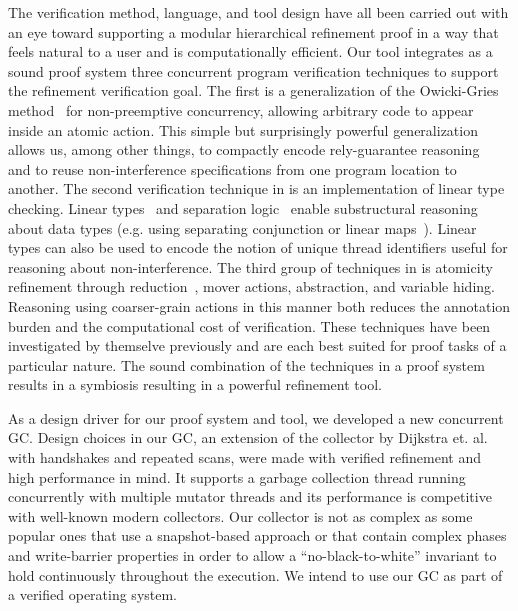 The verification method, language, and tool design have all been carried out with an eye toward supporting a modular hierarchical refinement proof in a way that feels natural to a user and is computationally efficient. 
Our tool integrates as a sound proof system three concurrent program verification techniques to support the refinement verification goal. 
The first \civl is a generalization of the Owicki-Gries method~\cite{OwickiG76} for non-preemptive concurrency, 
allowing arbitrary code to appear inside an atomic action. 
This simple but surprisingly powerful generalization allows us, among other things, to compactly encode rely-guarantee reasoning~\cite{Jones83}
and to reuse non-interference specifications from one program location to another.
The second verification technique in \civl is an implementation of linear type checking.
Linear types~\cite{Wadler90lineartypes} and separation logic~\cite{Reynolds02} enable substructural reasoning about data types
(e.g. using separating conjunction or linear maps~\cite{LahiriQW11}).
Linear types can also be used to encode the notion of unique thread identifiers useful for reasoning about non-interference. 
The third group of techniques in \civl is atomicity refinement through reduction~\cite{Lipton}, mover actions, abstraction, and variable hiding.
Reasoning using coarser-grain actions in this manner both reduces the annotation burden and the computational cost of verification. 
These techniques have been investigated by themselve previously and are each best suited for proof tasks of a particular nature. 
The sound combination of the techniques in a proof system results in a symbiosis resulting in a powerful refinement tool. 

As a design driver for our proof system and tool, we developed a new concurrent GC. 
Design choices in our GC, an extension of the collector by Dijkstra et. al. \cite{dijk78}  with handshakes \cite{doli93,doli94} and repeated scans, were made with verified refinement and high performance in mind. 
It supports a garbage collection thread running concurrently with multiple mutator threads and its performance is competitive with well-known modern collectors. 
Our collector is not as complex as some popular ones that use a snapshot-based approach \cite{doli93,doli94,doma00,azat03} or that contain complex phases and write-barrier properties \cite{boeh91,prin00a,bara05} in order to allow a ``no-black-to-white'' invariant to hold continuously throughout the execution. We intend to use our GC as part of a verified operating system. 

